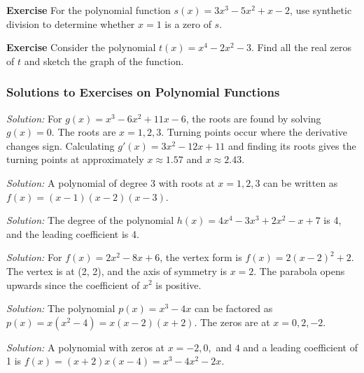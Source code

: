 \documentclass[a4paper,12pt]{book}
\newenvironment{exercise}[1][]
  {\par\medskip\noindent\textbf{Exercise #1} \rmfamily}
  {\medskip}
\newenvironment{solution}[1][]
{\par\noindent\textit{Solution:} \rmfamily}{\medskip}
\begin{document}
\begin{exercise}
For the polynomial function \( s(x) = 3x^3 - 5x^2 + x - 2 \), use synthetic division to determine whether \( x = 1 \) is a zero of \( s \).
\end{exercise}

\begin{exercise}
Consider the polynomial \( t(x) = x^4 - 2x^2 - 3 \). Find all the real zeros of \( t \) and sketch the graph of the function.
\end{exercise}

\subsubsection*{Solutions to Exercises on Polynomial Functions}

\begin{solution}[1]
For \( g(x) = x^3 - 6x^2 + 11x - 6 \), the roots are found by solving \( g(x) = 0 \). The roots are \( x = 1, 2, 3 \). Turning points occur where the derivative changes sign. Calculating \( g'(x) = 3x^2 - 12x + 11 \) and finding its roots gives the turning points at approximately \( x \approx 1.57 \) and \( x \approx 2.43 \).
\end{solution}

\begin{solution}[2]
A polynomial of degree 3 with roots at \( x = 1, 2, 3 \) can be written as \( f(x) = (x - 1)(x - 2)(x - 3) \).
\end{solution}

\begin{solution}[3]
The degree of the polynomial \( h(x) = 4x^4 - 3x^3 + 2x^2 - x + 7 \) is 4, and the leading coefficient is 4.
\end{solution}

\begin{solution}[4]
For \( f(x) = 2x^2 - 8x + 6 \), the vertex form is \( f(x) = 2(x - 2)^2 + 2 \). The vertex is at (2, 2), and the axis of symmetry is \( x = 2 \). The parabola opens upwards since the coefficient of \( x^2 \) is positive.
\end{solution}

\begin{solution}[5]
The polynomial \( p(x) = x^3 - 4x \) can be factored as \( p(x) = x(x^2 - 4) = x(x - 2)(x + 2) \). The zeros are at \( x = 0, 2, -2 \).
\end{solution}

\begin{solution}[6]
A polynomial with zeros at \( x = -2, 0, \) and \( 4 \) and a leading coefficient of 1 is \( f(x) = (x + 2)x(x - 4) = x^3 - 4x^2 - 2x \).
\end{solution}
\end{document}
